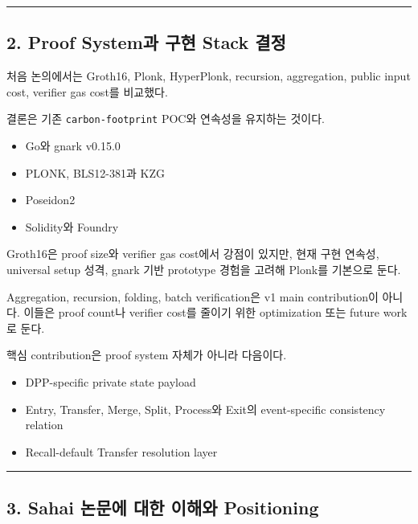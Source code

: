 \documentclass[11pt]{extarticle}
\begin{document}
\begin{center}\rule{0.5\linewidth}{0.5pt}\end{center}

\subsection{2. Proof System과 구현 Stack
결정}\label{2-proof-systemuxacfc-uxad6cuxd604-stack-uxacb0uxc815}

처음 논의에서는 Groth16, Plonk, HyperPlonk, recursion, aggregation,
public input cost, verifier gas cost를 비교했다.

결론은 기존 \texttt{carbon-footprint} POC와 연속성을 유지하는 것이다.

\begin{itemize}
  \item Go와 gnark v0.15.0
  \item PLONK, BLS12-381과 KZG
  \item Poseidon2
  \item Solidity와 Foundry
\end{itemize}

Groth16은 proof size와 verifier gas cost에서 강점이 있지만, 현재 구현
연속성, universal setup 성격, gnark 기반 prototype 경험을 고려해 Plonk를
기본으로 둔다.

Aggregation, recursion, folding, batch verification은 v1 main
contribution이 아니다. 이들은 proof count나 verifier cost를 줄이기 위한
optimization 또는 future work로 둔다.

핵심 contribution은 proof system 자체가 아니라 다음이다.

\begin{itemize}
  \item DPP-specific private state payload
  \item Entry, Transfer, Merge, Split, Process와 Exit의 event-specific consistency relation
  \item Recall-default Transfer resolution layer
\end{itemize}

\begin{center}\rule{0.5\linewidth}{0.5pt}\end{center}

\subsection{3. Sahai 논문에 대한 이해와
Positioning}\label{3-sahai-uxb17cuxbb38uxc5d0-uxb300uxd55c-uxc774uxd574uxc640-positioning}
\end{document}
